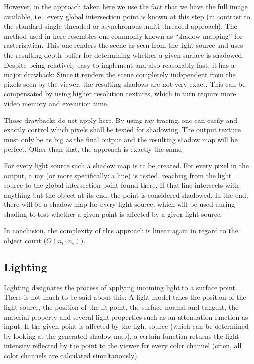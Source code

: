 \documentclass[english,fleqn,10pt,twocolumn]{article}
\begin{document}
However, in the approach taken here we use the fact that we have the full image available, i.e., every global intersection point is known at this step (in contrast to the standard single-threaded or asynchronous multi-threaded
approach). The method used in here resembles one commonly known as “shadow mapping” for rasterization. This one renders the scene as seen from the light source and uses the resulting depth buffer for determining whether a given surface
is shadowed. Despite being relatively easy to implement and also reasonably fast, it has a major drawback: Since it renders the scene completely independent from the pixels seen by the viewer, the resulting shadows are not very exact.
This can be compensated by using higher resolution textures, which in turn require more video memory and execution time.

Those drawbacks do not apply here. By using ray tracing, one can easily and exactly control which pixels shall be tested for shadowing. The output texture must only be as big as the final output and the resulting shadow map will be
perfect. Other than that, the approach is exactly the same.

For every light source such a shadow map is to be created. For every pixel in the output, a ray (or more specifically: a line) is tested, reaching from the light source to the global intersection point found there. If that line
intersects with anything but the object at its end, the point is considered shadowed. In the end, there will be a shadow map for every light source, which will be used during shading to test whether a given point is affected by a given
light source.

In conclusion, the complexity of this approach is linear again in regard to the object count ($O(n_l \cdot n_o)$).

\subsection{Lighting}

Lighting designates the process of applying incoming light to a surface point. There is not much to be said about this: A light model takes the position of the light source, the position of the lit point, the surface normal and
tangent, the material property and several light properties such as an attenuation function as input. If the given point is affected by the light source (which can be determined by looking at the generated shadow map), a certain
function returns the light intensity reflected by the point to the viewer for every color channel (often, all color channels are calculated simultanously).
\end{document}
